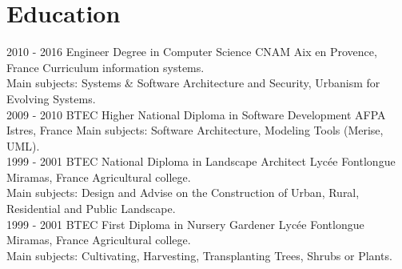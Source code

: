 \documentclass[]{friggeri-cv}
\begin{document}
\newpage
\section{Education}
\begin{entrylist}
  \entry
    {2010 - 2016}
    {Engineer Degree in Computer Science}
    {CNAM Aix en Provence, France}
    {Curriculum information systems.\\
    Main subjects: Systems \& Software Architecture and Security, Urbanism for Evolving Systems.\\}
  \entry
    {2009 - 2010}
    {BTEC Higher National Diploma in Software Development}
    {AFPA Istres, France}
    {Main subjects: Software Architecture, Modeling Tools (Merise, UML).\\}
  \entry
    {1999 - 2001}
    {BTEC National Diploma in Landscape Architect}
    {Lycée Fontlongue Miramas, France}
    {Agricultural college.\\
    Main subjects: Design and Advise on the Construction of Urban, Rural, Residential and Public Landscape.\\}
  \entry
    {1999 - 2001}
    {BTEC First Diploma in Nursery Gardener}
    {Lycée Fontlongue Miramas, France}
    {Agricultural college.\\
    Main subjects: Cultivating, Harvesting, Transplanting Trees, Shrubs or Plants.}
\end{entrylist}
\end{document}
